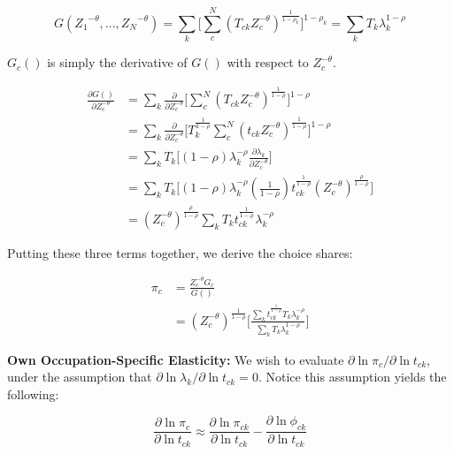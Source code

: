 \documentclass[10pt]{article}
\begin{document}
\begin{equation*}
    G({Z_{1}}^{-\theta},...,{Z_{N}}^{-\theta})=\sum\limits_{k}\Big[\sum\limits_{c}^{N}({T_{ck}}{Z_{c}^{-\theta}})^{\frac{1}{1-\rho_{k}}}\Big]^{1-\rho_{k}} = \sum\limits_{k}{T_{k}}\lambda^{1-\rho}_{k}
\end{equation*}

$G_{c}()$ is simply the derivative of $G()$ with respect to $Z_{c}^{-\theta}$.

\begin{align*}
    \frac{\partial{G()}}{\partial{Z_{c}^{-\theta}}} & = \sum\limits_{k}\frac{\partial}{\partial{Z_{c}^{-\theta}}}\Big[\sum\limits_{c}^{N}({T_{ck}}{Z_{c}^{-\theta}})^{\frac{1}{1-\rho}}\Big]^{1-\rho} \\ &= \sum\limits_{k}\frac{\partial}{\partial{Z_{c}^{-\theta}}}\Big[{T^{\frac{1}{1-\rho}}_{k}}\sum\limits_{c}^{N}({t_{ck}}{Z_{c}^{-\theta}})^{\frac{1}{1-\rho}}\Big]^{1-\rho} \\ &= \sum\limits_{k}{T_{k}}\Big[(1-\rho)\lambda^{-\rho}_{k}\frac{\partial{\lambda_{k}}}{\partial{Z_{c}^{-\theta}}}\Big] \\ &= \sum\limits_{k}{T_{k}}\Big[(1-\rho)\lambda^{-\rho}_{k}(\frac{1}{1-\rho}){t^{\frac{1}{1-\rho}}_{ck}}(Z_{c}^{-\theta})^{\frac{\rho}{1-\rho}}\Big]\\ &= (Z_{c}^{-\theta})^{\frac{\rho}{1-\rho}}\sum\limits_{k}{T_{k}}{t^{\frac{1}{1-\rho}}_{ck}}\lambda_{k}^{-\rho}
\end{align*}

Putting these three terms together, we derive the choice shares:

\begin{align*}
    \pi_{c} & = \frac{Z_{c}^{-\theta}{G_{c}}}{G()} \\ &= (Z_{c}^{-\theta})^{\frac{1}{1-\rho}}\Bigg[\frac{\sum\limits_{k}{t^{\frac{1}{1-\rho}}_{ck}}{T_{k}}\lambda_{k}^{-\rho}}{\sum\limits_{k}{T_{k}}\lambda_{k}^{1-\rho}}\Bigg]
\end{align*}

\noindent\textbf{Own Occupation-Specific Elasticity:} We wish to evaluate $\partial\ln{\pi_{c}}/\partial\ln{t_{ck}}$, under the assumption that $\partial\ln{\lambda_{k}}/\partial\ln{t_{ck}}=0$. Notice this assumption yields the following:

\begin{equation*}
    \frac{\partial\ln{\pi_{c}}}{\partial\ln{t_{ck}}} \approx \frac{\partial\ln{\pi_{ck}}}{\partial\ln{t_{ck}}} - \frac{\partial\ln{\phi_{ck}}}{\partial\ln{t_{ck}}}
\end{equation*}
\end{document}
